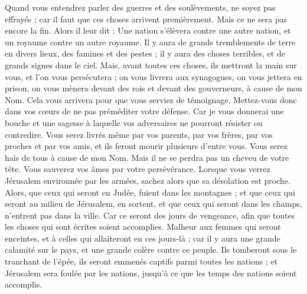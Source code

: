 \begin{multicols}{2}
Quand vous entendrez parler des guerres et des soulèvements, ne soyez pas effrayés ; car il faut que ces choses arrivent premièrement. Mais ce ne sera pas encore la fin.
Alors il leur dit : Une nation s'élèvera contre une autre nation, et un royaume contre un autre royaume.
Il y aura de grands tremblements de terre en divers lieux, des famines et des pestes ; il y aura des choses terribles, et de grands signes dans le ciel.
Mais, avant toutes ces choses, ils mettront la main sur vous, et l'on vous persécutera ; on vous livrera aux synagogues, on vous jettera en prison, on vous mènera devant des rois et devant des gouverneurs, à cause de mon Nom.
Cela vous arrivera pour que vous serviez de témoignage.
Mettez-vous donc dans vos cœurs de ne pas préméditer votre défense.
Car je vous donnerai une bouche et une sagesse à laquelle vos adversaires ne pourront résister ou contredire.
Vous serez livrés même par vos parents, par vos frères, par vos proches et par vos amis, et ils feront mourir plusieurs d'entre vous.
Vous serez haïs de tous à cause de mon Nom.
Mais il ne se perdra pas un cheveu de votre tête.
Vous sauverez vos âmes par votre persévérance.
Lorsque vous verrez Jérusalem environnée par les armées, sachez alors que sa désolation est proche.
Alors, que ceux qui seront en Judée, fuient dans les montagnes ; et que ceux qui seront au milieu de Jérusalem, en sortent, et que ceux qui seront dans les champs, n'entrent pas dans la ville.
Car ce seront des jours de vengeance, afin que toutes les choses qui sont écrites soient accomplies.
Malheur aux femmes qui seront enceintes, et à celles qui allaiteront en ces jours-là ; car il y aura une grande calamité sur le pays, et une grande colère contre ce peuple.
Ils tomberont sous le tranchant de l'épée, ils seront emmenés captifs parmi toutes les nations ; et Jérusalem sera foulée par les nations, jusqu'à ce que les temps des nations soient accomplis.

\end{multicols}
